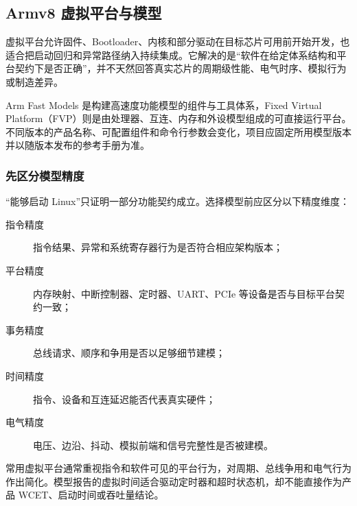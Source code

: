 \subsection{Armv8 虚拟平台与模型}
\label{sec:armv8-virtual-platforms}

虚拟平台允许固件、Bootloader、内核和部分驱动在目标芯片可用前开始开发，也适合把启动回归和异常路径纳入持续集成。它解决的是“软件在给定体系结构和平台契约下是否正确”，并不天然回答真实芯片的周期级性能、电气时序、模拟行为或制造差异。

Arm Fast Models 是构建高速度功能模型的组件与工具体系，Fixed Virtual Platform（FVP）则是由处理器、互连、内存和外设模型组成的可直接运行平台\cite{arm-fast-models,arm-fvp-overview}。不同版本的产品名称、可配置组件和命令行参数会变化，项目应固定所用模型版本并以随版本发布的参考手册为准。

\subsubsection{先区分模型精度}

“能够启动 Linux”只证明一部分功能契约成立。选择模型前应区分以下精度维度：

\begin{description}
  \item[指令精度] 指令结果、异常和系统寄存器行为是否符合相应架构版本；
  \item[平台精度] 内存映射、中断控制器、定时器、UART、PCIe 等设备是否与目标平台契约一致；
  \item[事务精度] 总线请求、顺序和争用是否以足够细节建模；
  \item[时间精度] 指令、设备和互连延迟能否代表真实硬件；
  \item[电气精度] 电压、边沿、抖动、模拟前端和信号完整性是否被建模。
\end{description}

常用虚拟平台通常重视指令和软件可见的平台行为，对周期、总线争用和电气行为作出简化。模型报告的虚拟时间适合驱动定时器和超时状态机，却不能直接作为产品 WCET、启动时间或吞吐量结论。

